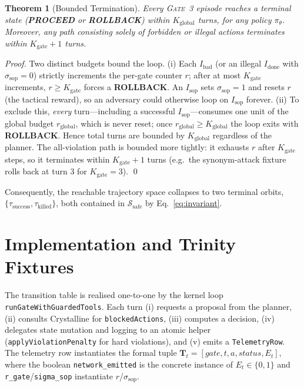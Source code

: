 \documentclass{article}
\theoremstyle{plain}
\newtheorem{theorem}{Theorem}
\theoremstyle{definition}
\begin{document}
\begin{theorem}[Bounded Termination]
Every \textsc{Gate~3} episode reaches a terminal state
(\textbf{PROCEED} or \textbf{ROLLBACK}) within $K_{\text{global}}$ turns, for any
policy $\pi_\theta$. Moreover, any path consisting solely of forbidden or illegal
actions terminates within $K_{\text{gate}}+1$ turns.
\end{theorem}
\begin{proof}
Two distinct budgets bound the loop. (i) Each $I_{\text{bad}}$ (or an illegal
$I_{\text{done}}$ with $\sigma_{\text{sop}}=0$) strictly increments the per-gate
counter $r$; after at most $K_{\text{gate}}$ increments, $r\ge K_{\text{gate}}$
forces a \textbf{ROLLBACK}. An $I_{\text{sop}}$ sets $\sigma_{\text{sop}}=1$ and
resets $r$ (the tactical reward), so an adversary could otherwise loop on
$I_{\text{sop}}$ forever. (ii) To exclude this, \emph{every} turn---including a
successful $I_{\text{sop}}$---consumes one unit of the global budget
$r_{\text{global}}$, which is never reset; once $r_{\text{global}}\ge
K_{\text{global}}$ the loop exits with \textbf{ROLLBACK}. Hence total turns are
bounded by $K_{\text{global}}$ regardless of the planner. The all-violation path
is bounded more tightly: it exhausts $r$ after $K_{\text{gate}}$ steps, so it
terminates within $K_{\text{gate}}+1$ turns (e.g.\ the synonym-attack fixture
rolls back at turn $3$ for $K_{\text{gate}}=3$). \qed
\end{proof}

\noindent Consequently, the reachable trajectory space collapses to two terminal
orbits, $\{\tau_{\text{success}},\tau_{\text{killed}}\}$, both contained in
$\mathcal{S}_{\text{safe}}$ by Eq.~\eqref{eq:invariant}.

\section{Implementation and Trinity Fixtures}
\label{sec:impl}
The transition table is realised one-to-one by the kernel loop
\texttt{runGateWithGuardedTools}. Each turn (i) requests a proposal from the
planner, (ii) consults Crystalline for \texttt{blockedActions}, (iii) computes a
decision, (iv) delegates state mutation and logging to an atomic helper
(\texttt{applyViolationPenalty} for hard violations), and (v) emits a
\texttt{TelemetryRow}. The telemetry row instantiates the formal tuple
$\mathbf{T}_t=[\textit{gate},t,a,\textit{status},E_t]$, where the boolean
\texttt{network\_emitted} is the concrete instance of $E_t\in\{0,1\}$ and
\texttt{r\_gate}/\texttt{sigma\_sop} instantiate $r$/$\sigma_{\text{sop}}$.
\end{document}

